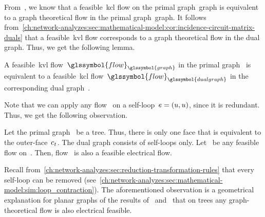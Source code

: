 From~, we know
that a feasible~\gls{kcl} flow on the primal graph~\gls{graph} is equivalent to
a graph theoretical flow in the primal graph~\gls{graph}.
% 
It follows
from~\cref{ch:network-analyzes:sec:mathematical-model:cor:incidence-circuit-matrix-duals}
that a feasible~\gls{kvl} flow corresponds to a graph theoretical flow in the
dual graph. Thus, we get the following lemma.
% 
\begin{lemma}
    A feasible~\gls{kvl} flow~$\glssymbol{flow}_{\glssymbol{graph}}$ in the
    primal graph~ is equivalent to a feasible~\gls{kcl}
    flow~$\glssymbol{flow}_{\glssymbol{dualgraph}}$ in the corresponding dual
    graph~.
    \label{ch:network-analyzes:sec:mathematical-model:lem:KVL-flow-in-dual}
\end{lemma}
% 
Note that we can apply any flow~ on a self-loop~$
    e 
    =
    (u,u)
$, since it is redundant. Thus, we get the following observation.
% 
\begin{observation}
    Let the primal graph~ be a tree. Thus, there is only one
    face that is equivalent to the outer-face~$c_t$. The dual graph
    consists of self-loops only. Let~ be any feasible flow
    on~. Then, flow~ is also a feasible
    electrical flow.
    \label{ch:network-analyzes:sec:mathematical-model:eq:bnorm}
\end{observation}
%
Recall from~\cref{ch:network-analyzes:sec:reduction-transformation-rules} that
every self-loop can be removed
(see~\cref{ch:network-analyzes:sec:mathematical-model:sim:loop_contraction}).
The aforementioned observation is a geometrical explanation for planar graphs of
the results of~\textcite[p.9; Lemma 4]{Leh15a} and~\textcite{Lei15b} that on
trees any graph-theoretical flow is also electrical feasible.

